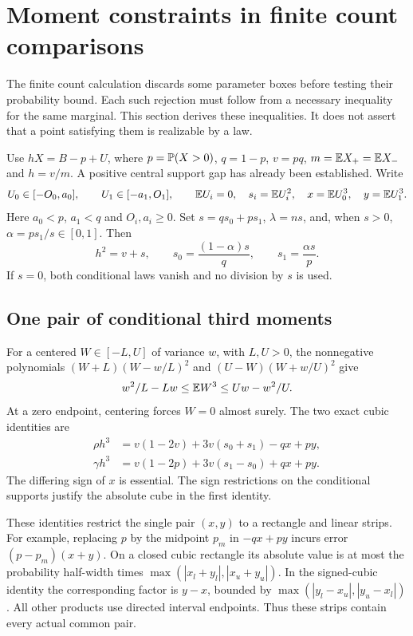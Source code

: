 \section{Moment constraints in finite count comparisons}
\label{ext:count-filters}
The finite count calculation discards some parameter boxes before testing
their probability bound. Each such rejection must follow from a necessary
inequality for the same marginal. This section derives these inequalities.
It does not assert that a point satisfying them is realizable by a law.

Use $hX=B-p+U$, where $p=\mathbb P(X>0)$, $q=1-p$, $v=pq$,
$m=\mathbb E X_+=\mathbb E X_-$ and $h=v/m$. A positive central support gap
has already been established. Write
\[
 U_0\in[-O_0,a_0],\qquad U_1\in[-a_1,O_1],\qquad
 \mathbb E U_i=0,\quad s_i=\mathbb E U_i^2,\quad x=\mathbb E U_0^3,\quad y=\mathbb E U_1^3.
\]
Here $a_0<p$, $a_1<q$ and $O_i,a_i\ge0$.
Set $s=qs_0+ps_1$, $\lambda=ns$, and, when $s>0$,
$\alpha=ps_1/s\in[0,1]$. Then
\[
 h^2=v+s,\qquad s_0=\frac{(1-\alpha)s}{q},\qquad
 s_1=\frac{\alpha s}{p}.
\]
If $s=0$, both conditional laws vanish and no division by $s$ is used.

\subsection{One pair of conditional third moments}
For a centered $W\in[-L,U]$ of variance $w$, with $L,U>0$,
the nonnegative polynomials $(W+L)(W-w/L)^2$ and
$(U-W)(W+w/U)^2$ give
\begin{equation}\label{ext:conditional-third}
 w^2/L-Lw\le\mathbb E W^3\le Uw-w^2/U.
\end{equation}
At a zero endpoint, centering forces $W=0$ almost surely.
The two exact cubic identities are
\begin{align}
 \rho h^3&=v(1-2v)+3v(s_0+s_1)-qx+py,\label{ext:rho-cubic}\\
 \gamma h^3&=v(1-2p)+3v(s_1-s_0)+qx+py.\label{ext:gamma-cubic}
\end{align}
The differing sign of $x$ is essential. The sign restrictions on the
conditional supports justify the absolute cube in the first identity.

These identities restrict the single pair $(x,y)$ to a rectangle and
linear strips. For example, replacing $p$ by the midpoint $p_m$ in
$-qx+py$ incurs error $(p-p_m)(x+y)$. On a closed cubic rectangle
its absolute value is at most the probability half-width times
$\max(|x_l+y_l|,|x_u+y_u|)$. In the signed-cubic identity the
corresponding factor is $y-x$, bounded by
$\max(|y_l-x_u|,|y_u-x_l|)$. All other products use directed interval
endpoints. Thus these strips contain every actual common pair.


